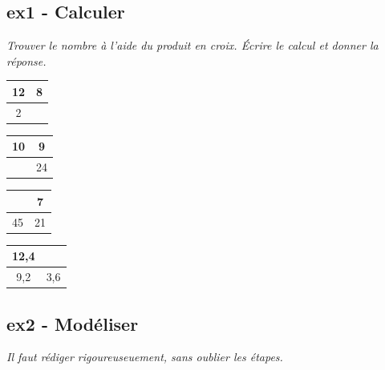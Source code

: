\documentclass[12pt]{article}
\begin{document}
\subsection*{ex1 - Calculer}
\textit{Trouver le nombre à l'aide du produit en croix. Écrire le calcul et donner la réponse.}

\begin{multicols}{4}

  \begin{center}
    \begin{tabular}{|c|c|}
      \hline
      12 & 8  \\
      \hline 
      2 &   \\
      \hline
    \end{tabular}

    \begin{tabular}{|c|c|}
      \hline
      10 & 9  \\
      \hline 
        & 24 \\
      \hline
    \end{tabular}

    \begin{tabular}{|c|c|}
      \hline
        &  7 \\
      \hline 
      45  & 21  \\
      \hline
    \end{tabular}

    \begin{tabular}{|c|c|}
      \hline
      12,4 &   \\
      \hline 
      9,2  & 3,6  \\
      \hline
    \end{tabular}
  \end{center}
\end{multicols}

\subsection*{ex2 - Modéliser}
\textit{Il faut rédiger rigoureuseuement, sans oublier les étapes.}
\end{document}
